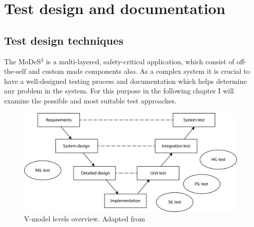 \chapter{Test design and documentation}\label{chapter:TestDoc}
\section{Test design techniques}

The MoDeS$^3$ is a multi-layered, safety-critical application, which consist of off-the-self and custom made components also. As a complex system it is crucial to have a well-designed testing process and documentation which helps determine any problem in the system. For this purpose in the following chapter I will examine the possible and most suitable test approaches.

\begin{figure}[!h]
	\centering
	\includegraphics[width=150mm]{figures/testDesign/V_model1.png}
	\caption{V-model levels overview. Adapted from \cite{V-model}}
	\label{fig:vModel}
\end{figure}

